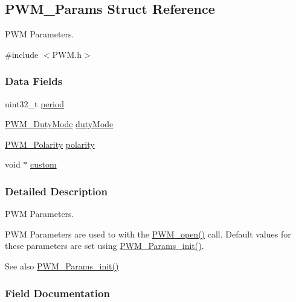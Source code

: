 \subsection{P\+W\+M\+\_\+\+Params Struct Reference}
\label{struct_p_w_m___params}


P\+W\+M Parameters.  




{\ttfamily \#include $<$P\+W\+M.\+h$>$}

\subsubsection*{Data Fields}
\begin{DoxyCompactItemize}
\item 
uint32\+\_\+t \hyperlink{struct_p_w_m___params_a6c88aaea599f9584db7b56fb2b1045f7}{period}
\item 
\hyperlink{_p_w_m_8h_a6c5ba2703cb9cc02773b5073046c1607}{P\+W\+M\+\_\+\+Duty\+Mode} \hyperlink{struct_p_w_m___params_ab054d20d938b0a6a2c93e1470aa42d15}{duty\+Mode}
\item 
\hyperlink{_p_w_m_8h_affa60cc974f99db4aeafc9f6524ec593}{P\+W\+M\+\_\+\+Polarity} \hyperlink{struct_p_w_m___params_ab8a3786f6ac3ca5306b9c57ba6fccede}{polarity}
\item 
void $\ast$ \hyperlink{struct_p_w_m___params_a37396e0fa9aac45d2a8292cf5d653471}{custom}
\end{DoxyCompactItemize}


\subsubsection{Detailed Description}
P\+W\+M Parameters. 

P\+W\+M Parameters are used to with the \hyperlink{_p_w_m_8h_ac963beab0c5c6901bf852f175028aeaf}{P\+W\+M\+\_\+open()} call. Default values for these parameters are set using \hyperlink{_p_w_m_8h_acbdd3192f9f06bf689e4a3855926dcac}{P\+W\+M\+\_\+\+Params\+\_\+init()}.

\begin{DoxySeeAlso}{See also}
\hyperlink{_p_w_m_8h_acbdd3192f9f06bf689e4a3855926dcac}{P\+W\+M\+\_\+\+Params\+\_\+init()} 
\end{DoxySeeAlso}


\subsubsection{Field Documentation}
